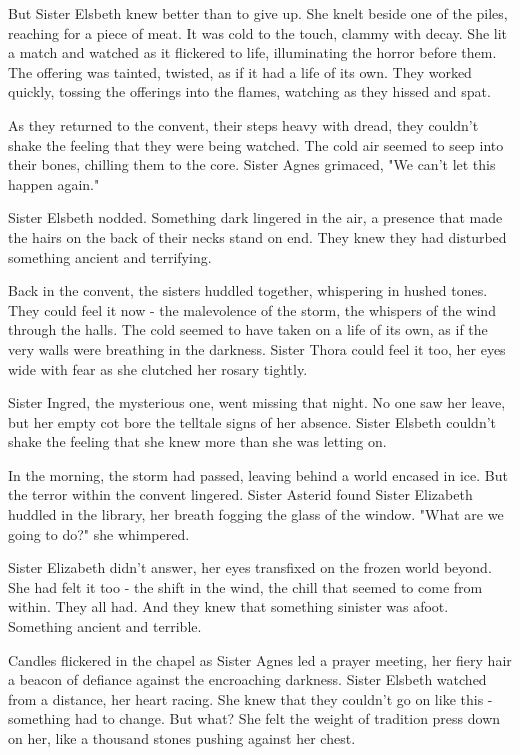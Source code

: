 \documentclass[11pt]{article}
\begin{document}
But Sister Elsbeth knew better than to give up. She knelt beside one of the piles, reaching for a piece of meat. It was cold to the touch, clammy with decay. She lit a match and watched as it flickered to life, illuminating the horror before them. The offering was tainted, twisted, as if it had a life of its own. They worked quickly, tossing the offerings into the flames, watching as they hissed and spat.

As they returned to the convent, their steps heavy with dread, they couldn't shake the feeling that they were being watched. The cold air seemed to seep into their bones, chilling them to the core. Sister Agnes grimaced, "We can't let this happen again."

Sister Elsbeth nodded. Something dark lingered in the air, a presence that made the hairs on the back of their necks stand on end. They knew they had disturbed something ancient and terrifying.

Back in the convent, the sisters huddled together, whispering in hushed tones. They could feel it now - the malevolence of the storm, the whispers of the wind through the halls. The cold seemed to have taken on a life of its own, as if the very walls were breathing in the darkness. Sister Thora could feel it too, her eyes wide with fear as she clutched her rosary tightly.

Sister Ingred, the mysterious one, went missing that night. No one saw her leave, but her empty cot bore the telltale signs of her absence. Sister Elsbeth couldn't shake the feeling that she knew more than she was letting on.

In the morning, the storm had passed, leaving behind a world encased in ice. But the terror within the convent lingered. Sister Asterid found Sister Elizabeth huddled in the library, her breath fogging the glass of the window. "What are we going to do?" she whimpered.

Sister Elizabeth didn't answer, her eyes transfixed on the frozen world beyond. She had felt it too - the shift in the wind, the chill that seemed to come from within. They all had. And they knew that something sinister was afoot.  Something ancient and terrible.

Candles flickered in the chapel as Sister Agnes led a prayer meeting, her fiery hair a beacon of defiance against the encroaching darkness. Sister Elsbeth watched from a distance, her heart racing. She knew that they couldn't go on like this - something had to change. But what? She felt the weight of tradition press down on her, like a thousand stones pushing against her chest.
\end{document}
